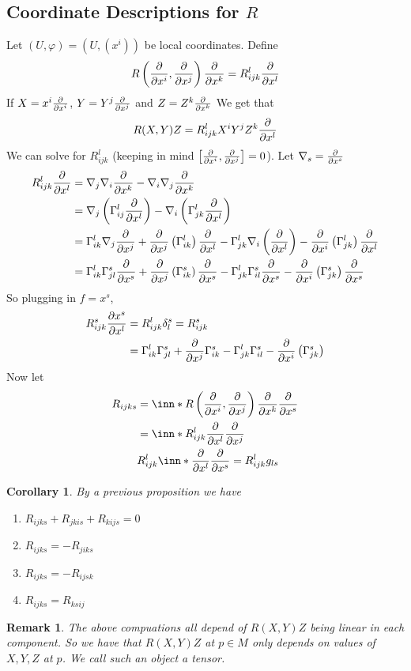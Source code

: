 \documentclass[a4paper]{article}
\newtheorem*{cor}{Corollary}
\newtheorem*{rem}{Remark}
\begin{document}
\subsection*{Coordinate Descriptions for $R$}%
Let $(U, \varphi) = (U, (x^i))$ be local coordinates. Define 
\[
  R\left(\pdv{x^i},\pdv{x^j}\right) \pdv{x^k} = R_{ijk}^l \pdv{x^l}
\]
If $X = x^i \pdv{x^i}$, $Y = Y^j \pdv{x^j}$ and $Z = Z^k \pdv{x^k}$
We get that
\[
  R(X,Y)Z = R_{ijk}^l X^iY^jZ^k \pdv{x^l}
\]
We can solve for $R_{ijk}^l$ (keeping in mind $\left[ \pdv{x^i}, \pdv{x^j} \right] = 0$). Let $\nabla_s = \pdv{x^s}$
\[
  \begin{aligned}
    R_{ijk}^l \pdv{x^l} &= \nabla_j \nabla_i \pdv{x^k} - \nabla_i \nabla_j \pdv{x^k} \\
                        &= \nabla_j \left( \Gamma_{ij}^l \pdv{x^l} \right) - \nabla_i \left( \Gamma_{jk}^l \pdv{x^l} \right) \\
                        &= \Gamma_{ik}^l \nabla_j \pdv{x^j} + \pdv{x^j} \left( \Gamma_{ik}^l \right)\pdv{x^l} - \Gamma_{jk}^l \nabla_i \left( \pdv{x^l} \right) - \pdv{x^i} \left( \Gamma_{jk}^l \right) \pdv{x^l} \\
                        &= \Gamma_{ik}^l \Gamma_{jl}^s \pdv{x^s} + \pdv{x^j} \left( \Gamma_{ik}^s \right) \pdv{x^s} - \Gamma_{jk}^l \Gamma_{il}^s \pdv{x^s} - \pdv{x^i} \left( \Gamma^s_{jk} \right) \pdv{x^s}
  \end{aligned}
\]
So plugging in $f = x^s$, 
\[
  \begin{aligned}
    R_{ijk}^s\pdv{x^s}{x^l} &= R_{ijk}^l \delta_l^s = R_{ijk}^s \\
                            &= \Gamma_{ik}^l\Gamma_{jl}^s + \pdv{x^j} \Gamma_{ik}^s - \Gamma_{jk}^l \Gamma_{il}^s - \pdv{x^i} \left( \Gamma_{jk}^s \right)
  \end{aligned}
\]
Now let
\[
  \begin{aligned}
    R_{ijks} &= \inn*{R \left( \pdv{x^i}, \pdv{x^j} \right) \pdv{x^k}}{\pdv{x^s}} \\
             &= \inn*{R_{ijk}^l \pdv{x^l}}{ \pdv{x^j}} \\
             & R_{ijk}^l \inn*{\pdv{x^l}}{\pdv{x^s}} = R_{ijk}^l g_{ls}
  \end{aligned}
\]
\begin{cor}
 By a previous proposition we have
 \begin{enumerate}
   \item $R_{ijks} + R_{jkis} + R_{kijs} = 0$
   \item $R_{ijks} = -R_{jiks}$
   \item $R_{ijks} = -R_{ijsk}$ 
   \item $R_{ijks} = R_{ksij}$
 \end{enumerate} 
\end{cor}

\begin{rem}
  The above compuations all depend of $R(X,Y)Z$ being linear in each component. So we have that $R(X,Y)Z$ at $p \in M$ only depends on values of $X,Y,Z$ at $p$. We call such an object a tensor.
\end{rem}
\end{document}
